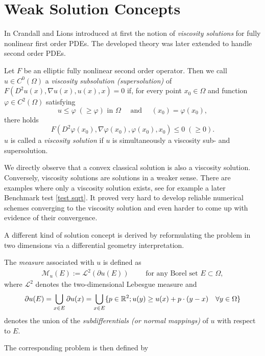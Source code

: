 \section{Weak Solution Concepts}
In \cite{CL1983} Crandall and Lions introduced at first the notion of \emph{viscosity solutions} for fully nonlinear first order PDEs. The developed theory was later extended to handle second order PDEs.
\begin{definition}
	Let $F$ be an elliptic fully nonlinear second order operator.
	Then we call $u \in C^0(\Omega)$ a \emph{viscosity subsolution (supersolution)} of $F(D^2u(x), \nabla u(x), u(x), x)=0$  if, for every point $x_0 \in \Omega$ and function $\varphi \in C^2(\Omega)$ satisfying
	\[
		u \leq \varphi \;(\geq \varphi) \text{ in }\Omega \quad \text{ and }\quad(x_0) = \varphi(x_0),
	\]
	there holds
	\[
		F(D^2\varphi(x_0),\nabla \varphi(x_0), \varphi(x_0), x_0) \leq 0 \;(\geq 0). 
	\]
	$u$ is called a \emph{viscosity solution} if $u$ is simultaneously a viscosity sub- and supersolution.
\end{definition}

We directly observe that a convex classical solution is also a viscosity solution. Conversely, viscosity solutions are solutions in a weaker sense. There are examples where only a viscosity solution exists, see for example a later Benchmark test \ref{test sqrt}.
It proved very hard to develop reliable numerical schemes converging to the viscosity solution and even harder to come up with evidence of their convergence.

A different kind of solution concept is derived by reformulating the \MA problem in two dimensions via a differential geometry interpretation.

\begin{definition}\label{def:MA measure}
	The \emph{\MA measure} associated with $u$ is defined as 
	\begin{align}
		\mathcal{M}_u (E) := \mathcal{L}^2(\partial u(E)) \qquad \text{ for any Borel set } E \subset \Omega,
	\end{align}
	where $\mathcal{L}^2$ denotes the two-dimensional Lebesgue measure and 
	\[
		\partial u(E) = \bigcup_{x \in E} \partial u (x) = \bigcup_{x \in E} \{p \in \mathbb{R}^2; u(y) \geq u(x) +p\cdot (y-x) \quad \forall y \in \Omega\}
	\]
	denotes the union of the \emph{subdifferentials (or normal mappings)} of $u$ with respect to $E$.
\end{definition}
The corresponding \MA problem is then defined by

